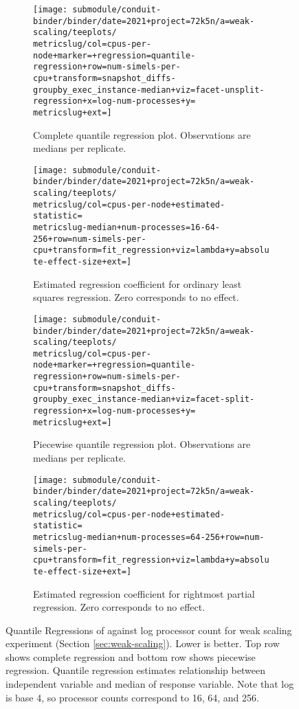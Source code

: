 \begin{figure*}
  \centering

  \begin{subfigure}[b]{0.5\textwidth}
    \centering
    \texttt{[image: submodule/conduit-binder/binder/date=2021+project=72k5n/a=weak-scaling/teeplots/\\metricslug/col=cpus-per-node+marker=+regression=quantile-regression+row=num-simels-per-cpu+transform=snapshot\_diffs-groupby\_exec\_instance-median+viz=facet-unsplit-regression+x=log-num-processes+y=\\metricslug+ext=]}
    \caption{
      Complete quantile regression plot.
      Observations are medians per replicate.
    }
    \label{fig:weak-scaling-regression-quantile-\metricslug-complete-regression}
  \end{subfigure}%
  \begin{subfigure}[b]{0.5\textwidth}
    \centering
    \texttt{[image: submodule/conduit-binder/binder/date=2021+project=72k5n/a=weak-scaling/teeplots/\\metricslug/col=cpus-per-node+estimated-statistic=\\metricslug-median+num-processes=16-64-256+row=num-simels-per-cpu+transform=fit\_regression+viz=lambda+y=absolute-effect-size+ext=]}
    \caption{Estimated regression coefficient for ordinary least squares regression. Zero corresponds to no effect.}
    \label{fig:weak-scaling-regression-quantile-\metricslug-complete-effect-size}
  \end{subfigure}

  \begin{subfigure}[b]{0.5\textwidth}
    \centering
    \texttt{[image: submodule/conduit-binder/binder/date=2021+project=72k5n/a=weak-scaling/teeplots/\\metricslug/col=cpus-per-node+marker=+regression=quantile-regression+row=num-simels-per-cpu+transform=snapshot\_diffs-groupby\_exec\_instance-median+viz=facet-split-regression+x=log-num-processes+y=\\metricslug+ext=]}
    \caption{
      Piecewise quantile regression plot.
      Observations are medians per replicate.
    }
    \label{fig:weak-scaling-regression-quantile-\metricslug-partial-regression}
  \end{subfigure}%
  \begin{subfigure}[b]{0.5\textwidth}
    \centering
    \texttt{[image: submodule/conduit-binder/binder/date=2021+project=72k5n/a=weak-scaling/teeplots/\\metricslug/col=cpus-per-node+estimated-statistic=\\metricslug-median+num-processes=64-256+row=num-simels-per-cpu+transform=fit\_regression+viz=lambda+y=absolute-effect-size+ext=]}
    \caption{Estimated regression coefficient for rightmost partial regression. Zero corresponds to no effect.}
    \label{fig:weak-scaling-regression-quantile-\metricslug-partial-effect-size}
  \end{subfigure}
  \caption{
  Quantile Regressions of \metric{} against log processor count for weak scaling experiment (Section \ref{sec:weak-scaling}).
  Lower is better.
  Top row shows complete regression and bottom row shows piecewise regression.
  Quantile regression estimates relationship between independent variable and median of response variable.
  Note that log is base 4, so processor counts correspond to 16, 64, and 256.
  }
  \label{fig:weak-scaling-regression-quantile-\metricslug}
\end{figure*}
